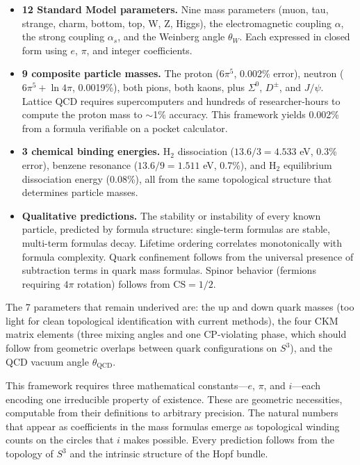 \documentclass[12pt]{article}
\begin{document}
\begin{itemize}
\item \textbf{12 Standard Model parameters.} Nine mass parameters (muon, tau, strange, charm, bottom, top, W, Z, Higgs), the electromagnetic coupling $\alpha$, the strong coupling $\alpha_s$, and the Weinberg angle $\theta_W$. Each expressed in closed form using $e$, $\pi$, and integer coefficients.

\item \textbf{9 composite particle masses.} The proton ($6\pi^5$, 0.002\% error), neutron ($6\pi^5 + \ln 4\pi$, 0.0019\%), both pions, both kaons, plus $\Sigma^0$, $D^\pm$, and $J/\psi$. Lattice QCD requires supercomputers and hundreds of researcher-hours to compute the proton mass to $\sim$1\% accuracy. This framework yields 0.002\% from a formula verifiable on a pocket calculator.

\item \textbf{3 chemical binding energies.} H$_2$ dissociation ($13.6/3 = 4.533$ eV, 0.3\% error), benzene resonance ($13.6/9 = 1.511$ eV, 0.7\%), and H$_2$ equilibrium dissociation energy (0.08\%), all from the same topological structure that determines particle masses.

\item \textbf{Qualitative predictions.} The stability or instability of every known particle, predicted by formula structure: single-term formulas are stable, multi-term formulas decay. Lifetime ordering correlates monotonically with formula complexity. Quark confinement follows from the universal presence of subtraction terms in quark mass formulas. Spinor behavior (fermions requiring $4\pi$ rotation) follows from $\mathrm{CS} = 1/2$.
\end{itemize}

The 7 parameters that remain underived are: the up and down quark masses (too light for clean topological identification with current methods), the four CKM matrix elements (three mixing angles and one CP-violating phase, which should follow from geometric overlaps between quark configurations on $S^3$), and the QCD vacuum angle $\theta_{\mathrm{QCD}}$.

This framework requires three mathematical constants---$e$, $\pi$, and $i$---each encoding one irreducible property of existence. These are geometric necessities, computable from their definitions to arbitrary precision. The natural numbers that appear as coefficients in the mass formulas emerge as topological winding counts on the circles that $i$ makes possible. Every prediction follows from the topology of $S^3$ and the intrinsic structure of the Hopf bundle.
\end{document}
